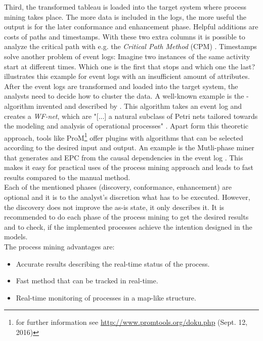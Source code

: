 Third, the transformed tableau is loaded into the target system where process mining takes place. The more data is included in the logs, the more useful the output is for the later conformance and enhancement phase. Helpful additions are costs of paths and timestamps. With these two extra columns it is possible to analyze the critical path with e.g. the \textit{Critical Path Method} (CPM) \cite{Domschke2015}. Timestamps solve another problem of event logs: Imagine two instances of the same activity start at different times. Which one is the first that stops and which one the last?\enlargethispage{1\baselineskip} \cite{Aalst2011} illustrates this example for event logs with an insufficient amount of attributes. \\
After the event logs are transformed and loaded into the target system, the analysts need to decide how to cluster the data. A well-known example is the \textalpha -algorithm invented and described by \cite{Aalst2011}. This algorithm takes an event log and creates a \textit{WF-net}, which are "[...] a natural subclass of Petri nets tailored towards the modeling and analysis of operational processes" \cite{Aalst2011}. Apart form this theoretic approach, tools like ProM\footnote{for further information see \url{http://www.promtools.org/doku.php} (Sept. 12, 2016)} offer plugins with algorithms that can be selected according to the desired input and output. An example is the Mutli-phase miner that generates and EPC from the causal dependencies in the event log \cite{Weimer2006}. This makes it easy for practical uses of the process mining approach and leads to fast results compared to the manual method. \\
Each of the mentioned phases (discovery, conformance, enhancement) are optional and it is to the analyst's discretion what has to be executed. However, the discovery does not improve the as-is state, it only describes it. It is recommended to do each phase of the process mining to get the desired results and to check, if the implemented processes achieve the intention designed in the models. \\
The process mining advantages are: 
\begin{itemize}
\item Accurate results describing the real-time status of the process. 
\item Fast method that can be tracked in real-time. 
\item Real-time monitoring of processes in a map-like structure. 
\end{itemize} 
 

